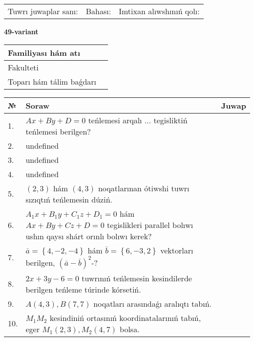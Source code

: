 \documentclass{article}
\begin{document}
\vspace{0.7cm}

\begin{tabular}{lll}
Tuwrı juwaplar sanı: \underline{\hspace{1cm}} & 
Bahası: \underline{\hspace{1cm}} & 
Imtixan alıwshınıń qolı: \underline{\hspace{2cm}} \\
\end{tabular}

\egroup

\newpage


\textbf{49-variant}\\

\bgroup
\def\arraystretch{1.6} %

\begin{tabular}{|m{5.7cm}|m{9.5cm}|}
\hline
Familiyası hám atı & \\
\hline
Fakulteti  & \\
\hline
Toparı hám tálim baǵdarı  & \\
\hline
\end{tabular}

\vspace{0.7cm}

\begin{tabular}{|m{0.7cm}|m{10cm}|m{4cm}|}
\hline
№ & Soraw & Juwap \\
\hline
1. & \(Ax + By + D = 0\) teńlemesi arqalı ... tegisliktiń teńlemesi berilgen? &  \\
\hline
2. & undefined &  \\
\hline
3. & undefined &  \\
\hline
4. & undefined &  \\
\hline
5. & $(2, 3)$ hám $(4, 3)$ noqatlarınan ótiwshi tuwrı sızıqtıń teńlemesin dúziń. &  \\
\hline
6. & \(A_{1}x + B_{1}y + C_{1}z + D_{1} = 0\) hám \(Ax + By + Cz + D = 0\) tegislikleri parallel bolıwı ushın qaysı shárt orınlı bolıwı kerek? &  \\
\hline
7. & \(\bar{a} = \left\{ 4,- 2,- 4 \right\}\) hám \(\bar{b} = \left\{ 6,- 3, 2 \right\}\) vektorları berilgen, \((\bar{a} - \bar{b}) ^{2}\)-? &  \\
\hline
8. & \(2 x + 3 y - 6 = 0\) tuwrınıń teńlemesin kesindilerde berilgen teńleme túrinde kórsetiń. &  \\
\hline
9. & \(A (4, 3), B (7, 7)\) noqatları arasındaǵı aralıqtı tabıń. &  \\
\hline
10. & \(M_{1}M_{2}\) kesindiniń ortasınıń koordinatalarınıń tabıń, eger \(M_{1} (2, 3), M_{2} (4, 7)\) bolsa. & \\
\hline
\end{tabular}
\end{document}
